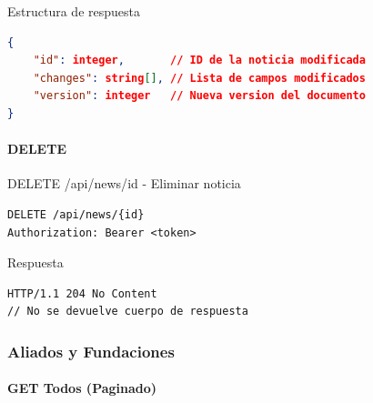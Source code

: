 \documentclass[11pt,a4paper]{article}
\begin{document}
\begin{center}
	\begin{minipage}{\textwidth}
		\begin{codebox}{Estructura de respuesta}
			\begin{lstlisting}[language=json]
{
    "id": integer,       // ID de la noticia modificada
    "changes": string[], // Lista de campos modificados
    "version": integer   // Nueva version del documento
}
\end{lstlisting}
		\end{codebox}
	\end{minipage}
\end{center}

\paragraph{DELETE}
\begin{center}
	\begin{minipage}{\textwidth}
		\begin{codebox}{DELETE /api/news/{id} - Eliminar noticia}
			\begin{lstlisting}[language=HTTP]
DELETE /api/news/{id}
Authorization: Bearer <token>
\end{lstlisting}
		\end{codebox}
	\end{minipage}
\end{center}

\begin{center}
	\begin{minipage}{\textwidth}
		\begin{codebox}{Respuesta}
			\begin{lstlisting}[language=HTTP]
HTTP/1.1 204 No Content
// No se devuelve cuerpo de respuesta
\end{lstlisting}
		\end{codebox}
	\end{minipage}
\end{center}


\subsubsection{Aliados y Fundaciones}
\paragraph{GET Todos (Paginado)}
\end{document}
